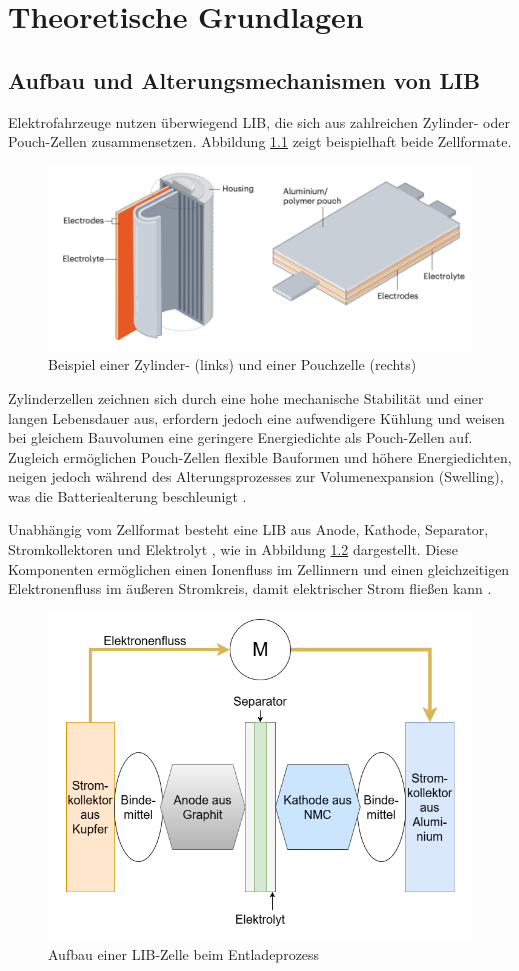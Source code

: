 
\chapter{Theoretische Grundlagen}

\section{Aufbau und Alterungsmechanismen von \acs{LIB}}
Elektrofahrzeuge nutzen überwiegend \acs{LIB}, die sich aus zahlreichen Zylinder- oder Pouch-Zellen zusammensetzen. Abbildung \ref{fig:pouch-zylinder-zelle} zeigt beispielhaft beide Zellformate. 
\begin{figure}[H]
	\centering
	\includegraphics[height=0.25\linewidth]{resources/images/pouch-zylinder-zelle}
	\caption{Beispiel einer Zylinder- (links) und einer Pouchzelle (rechts)}
	\label{fig:pouch-zylinder-zelle}
\end{figure}

Zylinderzellen zeichnen sich durch eine hohe mechanische Stabilität und einer langen Lebensdauer aus, erfordern jedoch eine aufwendigere Kühlung und weisen bei gleichem Bauvolumen eine geringere Energiedichte als Pouch-Zellen auf. Zugleich ermöglichen Pouch-Zellen flexible Bauformen und höhere Energiedichten, neigen jedoch während des Alterungsprozesses zur Volumenexpansion (Swelling), was die Batteriealterung beschleunigt \cite{articlePouchZellenAlterung}.
\par
Unabhängig vom Zellformat besteht eine \acs{LIB} aus Anode, Kathode, Separator, Stromkollektoren und Elektrolyt \cite{urlIdRecentAdvancementsLIB}, wie in Abbildung \ref{fig:aufbau-nmc-zelle} dargestellt. Diese Komponenten ermöglichen einen Ionenfluss im Zellinnern und einen gleichzeitigen Elektronenfluss im äußeren Stromkreis, damit elektrischer Strom fließen kann \cite{urlIdLIBFUnktionsweise}.
\begin{figure}[H]
	\centering
	\includegraphics[height=0.4\linewidth]{resources/images/aufbau-nmc-zelle}
	\caption{Aufbau einer \acs{LIB}-Zelle beim Entladeprozess \cite{articleAlterungLithiumBatterien}}
	\label{fig:aufbau-nmc-zelle}
\end{figure}

